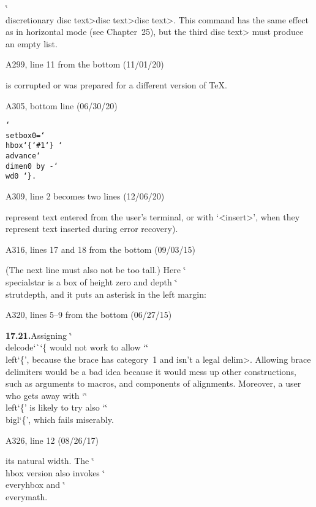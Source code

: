 \ninepoint
\textindent{$\bull$} \.{\char`\\discretionary}%
  \<disc text>\<disc text>\<disc text>.\enskip
This command has the same effect as in horizontal mode (see Chapter~25), but the
third \<disc text> must produce an empty list.

\bugonpage A299, line 11 from the bottom (11/01/20)

\ninepoint\noindent
is corrupted or was prepared for a different version of \TeX.

\bugonpage A305, bottom line (06/30/20)

\ninepoint\indent
\tt \char`\\setbox0=\char`\\hbox\char`\{\char`\#1\char`\}%
\char`\\advance\char`\\dimen0 by -\char`\\wd0 \char`\}\rm.

\bugonpage A309, line 2 becomes two lines (12/06/20)

\ninepoint\noindent
represent text entered from the user's terminal, or with
`\.{<insert>}', when they
represent text inserted during error recovery).

\bugonpage A316, lines 17 and 18 from the bottom (09/03/15)

\ninepoint\noindent
(The next line must also not be too tall.)
Here \.{\char`\\specialstar} is a box of height zero and depth
\.{\char`\\strutdepth},
and it puts an asterisk in the left margin:

\bugonpage A320, lines 5--9 from the bottom (06/27/15)

\ninepoint\noindent
{\bf 17.21.}\enspace Assigning \.{\char`\\delcode\char`\`\char`\{} 
would not work to allow `\.{\char`\\left\char`\{}', because
the brace has category~1 and isn't a legal \<delim>.
Allowing brace delimiters would be a bad idea because it would
mess up other constructions, such as arguments to macros, and
components of alignments. Moreover, a user who
gets away with `\.{\char`\\left\char`\{}'
is likely to try also `\.{\char`\\bigl\char`\{}', which
fails miserably.

\bugonpage A326, line 12 (08/26/17)

\ninepoint\noindent
its natural width. The \.{\char`\\hbox} version also invokes
\.{\char`\\everyhbox} and \.{\char`\\everymath}.

